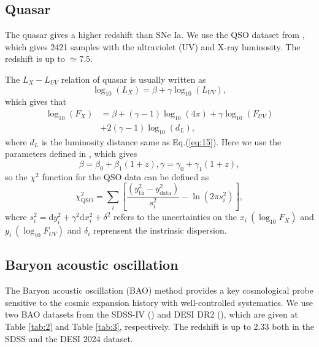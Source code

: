 \documentclass[twocolumn]{aastex631}
\begin{document}
\subsection{Quasar}

   The quasar gives a higher redshift than SNe Ia.
   We use the QSO dataset from \cite{Lusso_2020}, which gives
   2421 samples with the ultraviolet (UV) and X-ray luminosity.
   The redshift is up to $\simeq7.5$.

   The $L_X-L_{UV}$ relation of quasar is usually written as
   \begin{equation}
      \log_{10}(L_X)=\beta+\gamma\log_{10}(L_{UV}),
   \end{equation}
   which gives that
   \begin{eqnarray}
      \nonumber\log_{10}(F_X)&=\beta+(\gamma-1)\log_{10}(4\pi)+\gamma\log_{10}(F_{UV})
                    \\ &+2(\gamma-1)\log_{10}(d_L),
   \end{eqnarray}
   where $d_L$ is the luminosity distance same as Eq.(\ref{eq:15}).
   Here we use the parameters defined in \cite{li2024redshiftevolutionxrayuv}, which
   gives\begin{equation}
      \beta=\beta_0+\beta_1(1+z),\gamma=\gamma_0+\gamma_1(1+z),
   \end{equation}
   so the $\chi^2$ function for the QSO data can be defined as
   \begin{equation}
      \chi_{\text{QSO}}^2=\sum_i\left[\frac{(y_{\text{th}}^2-y_{\text{data}}^2)}{s_i^2}
      -\ln(2\pi s_i^2)\right],
   \end{equation}
   where $s_i^2=\mathrm{d}y_i^2+\gamma^2\mathrm{d}x_i^2+\delta^2$ refers to the 
   uncertainties on the $x_i\ (\log_{10}F_X)$ and $y_i\ (\log_{10}F_{UV})$ and
   $\delta_i$ reprensent the instrinsic dispersion.

\subsection{Baryon acoustic oscillation}

   The Baryon acoustic oscillation (BAO) method provides a key cosmological probe
   sensitive to the cosmic expansion history with well-controlled systematics.
   We use two BAO datasets from the SDSS-IV (\cite{PhysRevD.103.083533}) and 
   DESI DR2 (\cite{desicollaboration2025desidr2resultsii}),
   which are given at Table \ref{tab:2} and Table \ref{tab:3}, respectively.
   The redshift is up to 2.33 both in the SDSS and the DESI 2024 dataset.
\end{document}
